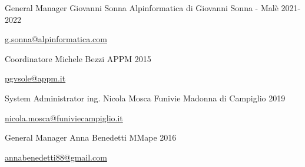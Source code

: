 

\begin{cventries}

  \cventry
    {General Manager} %
    {Giovanni Sonna} %
    {Alpinformatica di Giovanni Sonna - Malè} %
    {2021-2022} %
    {
      \begin{cvitems} %
        \item {\href{mailto:g.sonna@alpinformatica.com}{g.sonna@alpinformatica.com}}
      \end{cvitems}
    }

  \cventry
    {Coordinatore} %
    {Michele Bezzi} %
    {APPM} %
    {2015} %
    {
      \begin{cvitems} %
        \item {\href{mailto:pgvsole@appm.it}{pgvsole@appm.it}}
      \end{cvitems}
    }

  \cventry
    {System Administrator} %
    {ing. Nicola Mosca} %
    {Funivie Madonna di Campiglio} %
    {2019} %
    {
      \begin{cvitems} %
        \item {\href{mailto:nicola.mosca@funiviecampiglio.it}{nicola.mosca@funiviecampiglio.it}}
      \end{cvitems}
    }

  \cventry
    {General Manager} %
    {Anna Benedetti} %
    {MMape} %
    {2016} %
    {
      \begin{cvitems} %
        \item {\href{mailto:annabenedetti88@gmail.com}{annabenedetti88@gmail.com}}
      \end{cvitems}
    }
 
\end{cventries}
